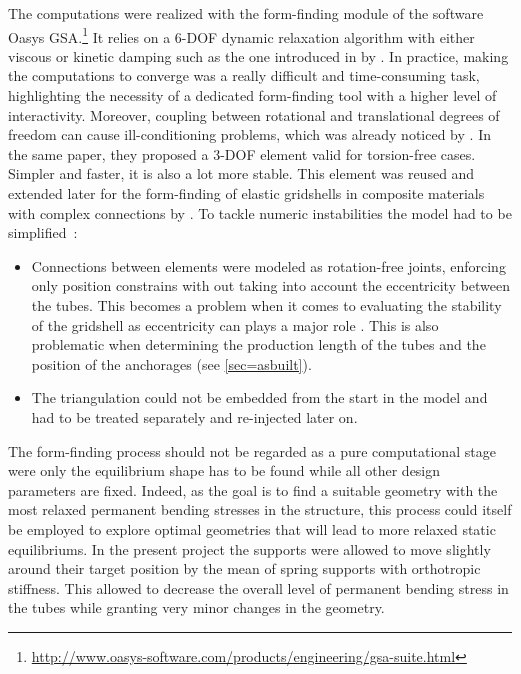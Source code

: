 The computations were realized with the form-finding module of the software Oasys GSA.\footnote{\url{http://www.oasys-software.com/products/engineering/gsa-suite.html}} It relies on a 6-DOF dynamic relaxation algorithm with either viscous or kinetic damping such as the one introduced in \citeyear{Adriaenssens2000} by \citet{Adriaenssens2000}. In practice, making the computations to converge was a really difficult and time-consuming task, highlighting the necessity of a dedicated form-finding tool with a higher level of interactivity. Moreover, coupling between rotational and translational degrees of freedom can cause ill-conditioning problems, which was already noticed by \citet{Adriaenssens2001}. In the same paper, they proposed a 3-DOF element valid for torsion-free cases. Simpler and faster, it is also a lot more stable. This element was reused and extended later for the form-finding of elastic gridshells in composite materials with complex connections by \citet{Douthe2007}. To tackle numeric instabilities the model had to be simplified~:
\begin{itemize}
\item Connections between elements were modeled as rotation-free joints, enforcing only position constrains with out taking into account the eccentricity between the tubes. This becomes a problem when it comes to evaluating the stability of the gridshell as eccentricity can plays a major role \cite{Lefevre2015}. This is also problematic when determining the production length of the tubes and the position of the anchorages (see \cref{sec=asbuilt}).
\item The triangulation could not be embedded from the start in the model and had to be treated separately and re-injected later on.
\end{itemize}

The form-finding process should not be regarded as a pure computational stage were only the equilibrium shape has to be found while all other design parameters are fixed. Indeed, as the goal is to find a suitable geometry with the most relaxed permanent bending stresses in the structure, this process could itself be employed to explore optimal geometries that will lead to more relaxed static equilibriums. In the present project the supports were allowed to move slightly around their target position by the mean of spring supports with orthotropic stiffness. This allowed to decrease the overall level of permanent bending stress in the tubes while granting very minor changes in the geometry.

